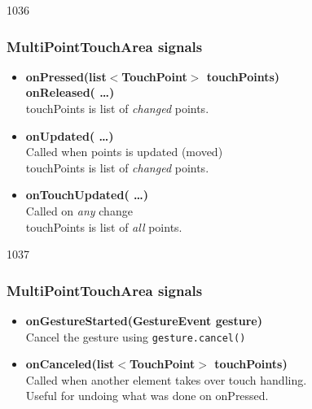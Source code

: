 \begin{slide}{1036}\frametitle{MultiPointTouchArea signals}

\begin{itemize}
\item \textbf{onPressed(list$<$TouchPoint$>$ touchPoints)}\\
  \textbf{onReleased( \ldots )}\\
  touchPoints is list of \textit{changed} points.\medskip

\item \textbf{onUpdated( \ldots )}\\
  Called when points is updated (moved)\\
  touchPoints is list of \textit{changed} points.\medskip

\item \textbf{onTouchUpdated( \ldots )}\\
  Called on \textit{any} change\\
  touchPoints is list of \textit{all} points.
\end{itemize}

\end{slide}

\begin{slide}{1037}\frametitle{MultiPointTouchArea signals}

\begin{itemize}
\item \textbf{onGestureStarted(GestureEvent gesture)}\\
  Cancel the gesture using \texttt{gesture.cancel()}\medskip

\item \textbf{onCanceled(list$<$TouchPoint$>$ touchPoints)}\\
  Called when another element takes over touch handling.\\
  Useful for undoing what was done on onPressed.
\end{itemize}

\end{slide}
